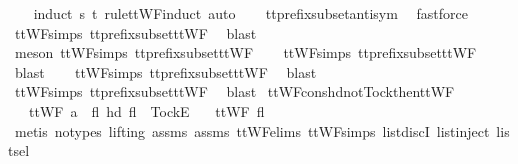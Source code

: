 \begin{isabellebody}
%
\isadelimproof
\ \ %
\endisadelimproof
%
\isatagproof
{}\isamarkupfalse%
\ {\isacharparenleft}induct\ s\ t\ rule{\isacharcolon}ttWF{}{\isachardot}induct{\isacharcomma}\ auto{\isacharparenright}\isanewline
\ \ \isamarkupfalse%
\ tt{\isacharunderscore}prefix{\isacharunderscore}subset{\isacharunderscore}antisym\ \isamarkupfalse%
\ fastforce\isanewline
\ \ \isamarkupfalse%
\ ttWF{\isachardot}simps{\isacharparenleft}{}{}{\isacharparenright}\ tt{\isacharunderscore}prefix{\isacharunderscore}subset{\isacharunderscore}ttWF\ \isamarkupfalse%
\ blast\isanewline
\ \ \isamarkupfalse%
\ {\isacharparenleft}meson\ ttWF{\isachardot}simps{\isacharparenleft}{}{}{\isacharparenright}\ tt{\isacharunderscore}prefix{\isacharunderscore}subset{\isacharunderscore}ttWF{\isacharparenright}\isanewline
\ \ \isamarkupfalse%
\ ttWF{\isachardot}simps{\isacharparenleft}{}{}{\isacharparenright}\ tt{\isacharunderscore}prefix{\isacharunderscore}subset{\isacharunderscore}ttWF\ \isamarkupfalse%
\ blast\isanewline
\ \ \isamarkupfalse%
\ ttWF{\isachardot}simps{\isacharparenleft}{}{\isacharparenright}\ tt{\isacharunderscore}prefix{\isacharunderscore}subset{\isacharunderscore}ttWF\ \isamarkupfalse%
\ blast\isanewline
\ \ \isamarkupfalse%
\ ttWF{\isachardot}simps{\isacharparenleft}{}{\isacharparenright}\ tt{\isacharunderscore}prefix{\isacharunderscore}subset{\isacharunderscore}ttWF\ \isamarkupfalse%
\ blast%
\endisatagproof
{\isafoldproof}%
%
\isadelimproof
\isanewline
%
\endisadelimproof
\isanewline
{}\isamarkupfalse%
\ ttWF{\isacharunderscore}cons{\isacharunderscore}hd{\isacharunderscore}not{\isacharunderscore}Tock{\isacharunderscore}then{\isacharunderscore}ttWF{\isacharcolon}\isanewline
\ \ \ {\isachardoublequoteopen}ttWF\ {\isacharparenleft}a\ {\isacharhash}\ fl{\isacharparenright}{\isachardoublequoteclose}\ {\isachardoublequoteopen}hd\ fl\ {\isasymnoteq}\ {\isacharbrackleft}Tock{\isacharbrackright}\isactrlsub E{\isachardoublequoteclose}\isanewline
\ \ \ {\isachardoublequoteopen}ttWF\ fl{\isachardoublequoteclose}\isanewline
%
\isadelimproof
\ \ %
\endisadelimproof
%
\isatagproof
{}\isamarkupfalse%
\ {\isacharparenleft}metis\ {\isacharparenleft}no{\isacharunderscore}types{\isacharcomma}\ lifting{\isacharparenright}\ assms{\isacharparenleft}{}{\isacharparenright}\ assms{\isacharparenleft}{}{\isacharparenright}\ ttWF{\isachardot}elims{\isacharparenleft}{}{\isacharparenright}\ ttWF{\isachardot}simps{\isacharparenleft}{}{\isacharparenright}\ list{\isachardot}discI\ list{\isachardot}inject\ list{\isachardot}sel{\isacharparenleft}{}{\isacharparenright}{\isacharparenright}%

\end{isabellebody}
